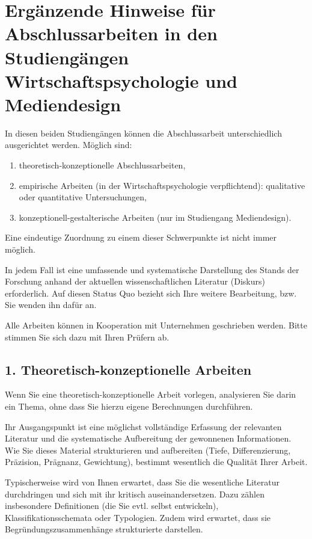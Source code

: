 \chapter{Ergänzende Hinweise für Abschlussarbeiten in den Studiengängen Wirtschaftspsychologie und Mediendesign}
\label{app:wirtschaftspsychologie-mediendesign}

In diesen beiden Studiengängen können die Abschlussarbeit unterschiedlich ausgerichtet werden. Möglich sind:
\begin{enumerate}
\item theoretisch-konzeptionelle Abschlussarbeiten,
\item empirische Arbeiten (in der Wirtschaftspsychologie verpflichtend): qualitative oder quantitative Untersuchungen,
\item konzeptionell-gestalterische Arbeiten (nur im Studiengang Mediendesign).
\end{enumerate}

Eine eindeutige Zuordnung zu einem dieser Schwerpunkte ist nicht immer möglich.

In jedem Fall ist eine umfassende und systematische Darstellung des Stands der Forschung anhand der aktuellen wissenschaftlichen Literatur (Diskurs) erforderlich. Auf diesen Status Quo bezieht sich Ihre weitere Bearbeitung, bzw. Sie wenden ihn dafür an.

Alle Arbeiten können in Kooperation mit Unternehmen geschrieben werden. Bitte stimmen Sie sich dazu mit Ihren Prüfern ab.

\section*{1. Theoretisch-konzeptionelle Arbeiten}

Wenn Sie eine theoretisch-konzeptionelle Arbeit vorlegen, analysieren Sie darin ein Thema, ohne dass Sie hierzu eigene Berechnungen durchführen.

Ihr Ausgangspunkt ist eine möglichst vollständige Erfassung der relevanten Literatur und die systematische Aufbereitung der gewonnenen Informationen. Wie Sie dieses Material strukturieren und aufbereiten (Tiefe, Differenzierung, Präzision, Prägnanz, Gewichtung), bestimmt wesentlich die Qualität Ihrer Arbeit.

Typischerweise wird von Ihnen erwartet, dass Sie die wesentliche Literatur durchdringen und sich mit ihr kritisch auseinandersetzen. Dazu zählen insbesondere Definitionen (die Sie evtl. selbst entwickeln), Klassifikationsschemata oder Typologien. Zudem wird erwartet, dass sie Begründungszusammenhänge strukturierte darstellen.

